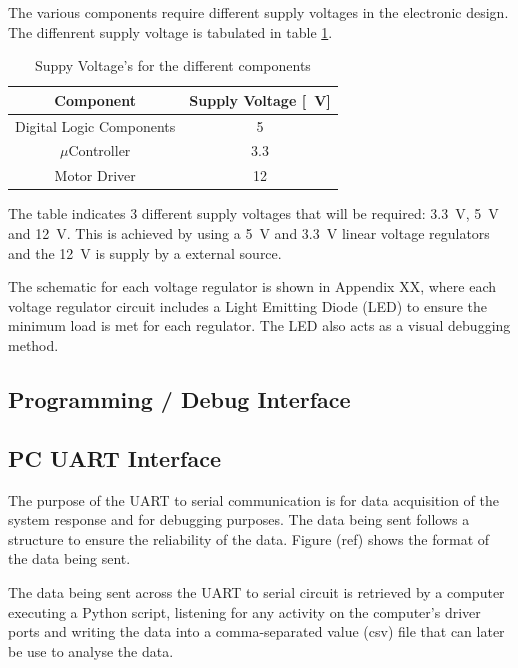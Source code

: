 \documentclass[a4paper,12pt]{article}
\begin{document}
	The various components require different supply voltages in the electronic design. The diffenrent supply voltage is tabulated in table \ref{table:supplyVoltage}.
	
		\begin{table}[]
			\begin{tabular}{|c|c|}
				\hline
				Component & Supply Voltage [\SI{}{V}] \\
				\hline
				Digital Logic Components & \SI{5}{} \\
				\hline
				$\mu$Controller & \SI{3.3}{} \\
				\hline
				Motor Driver & \SI{12}{} \\
				\hline
			\end{tabular}
		\caption{Suppy Voltage's for the different components}
		\label{table:supplyVoltage}
		\end{table}
	
	
	The table indicates 3 different supply voltages that will be required: \SI{3.3}{V}, \SI{5}{V} and \SI{12}{V}. This is achieved by using a \SI{5}{V} and \SI{3.3}{V} linear voltage regulators and the \SI{12}{V} is supply by a external source.
	
	The schematic for each voltage regulator is shown in Appendix XX, where each voltage regulator circuit includes a Light Emitting Diode (LED) to ensure the minimum load is met for each regulator. The LED also acts as a visual debugging method.

	\subsection{Programming / Debug Interface}
	
	\subsection{PC UART Interface }
	
	The purpose of the UART to serial communication is for data acquisition of the system response and for debugging purposes. The data being sent follows a structure to ensure the reliability of the data. Figure (ref) shows the format of the data being sent.
	
	The data being sent across the UART to serial circuit is retrieved by a computer executing a Python script, listening for any activity on the computer's driver ports and writing the data into a comma-separated value (csv) file that can later be use to analyse the data.
	
\end{document}

